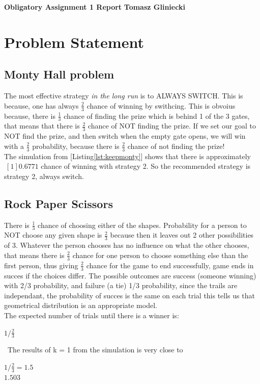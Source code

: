 \documentclass[a4paper, 11pt]{article}
\begin{document}
\noindent
\large\textbf{Obligatory Assignment 1 Report} \hfill \textbf{Tomasz Gliniecki} \\

\section*{Problem Statement}
\subsection*{Monty Hall problem}
The most effective strategy \emph{in the long run} is to ALWAYS SWITCH. This is because, one has always $\frac{2}{3}$ chance of winning by swithcing. This is obvoius because, there is $\frac{1}{3}$ chance of finding the prize which is behind 1 of the 3 gates, that means that there is $\frac{2}{3}$ chance of NOT finding the prize. If we set our goal to NOT find the prize, and then switch when the empty gate opens, we will win with a $\frac{2}{3}$ probability, because there is $\frac{2}{3}$ chance of not finding the prize!\\
The simulation from [Listing\ref{lst:keepmonty}] shows that there is approximately $ ~[1] 0.6771 $ chance of winning with strategy 2. So the recommended strategy is strategy 2, always switch.

\subsection*{Rock Paper Scissors}
There is $\frac{1}{3}$ chance of choosing either of the shapes. Probability for a person to NOT choose any given shape is $\frac{2}{3}$ because then it leaves out 2 other possibilities of 3. Whatever the person chooses has no influence on what the other chooses, that means there is $\frac{2}{3}$ chance for one person to choose something else than the first person, thus giving $\frac{2}{3}$ chance for the game to end successfully, game ends in succes if the choices differ. The possible outcomes are success (someone winning) with 2/3 probability, and failure (a tie) 1/3 probability, since the trails are independant, the probability of succes is the same on each trial this tells us that geometrical distribution is an appropriate model.\\
The expected number of trials until there is a winner is:
\begin{center}$ 1/\frac{2}{3}  $\end{center}\
The results of k = 1 from the simulation is very close to
\begin{center}$ 1/\frac{2}{3} =1.5 $\\$1.503$\end{center}
\end{document}
